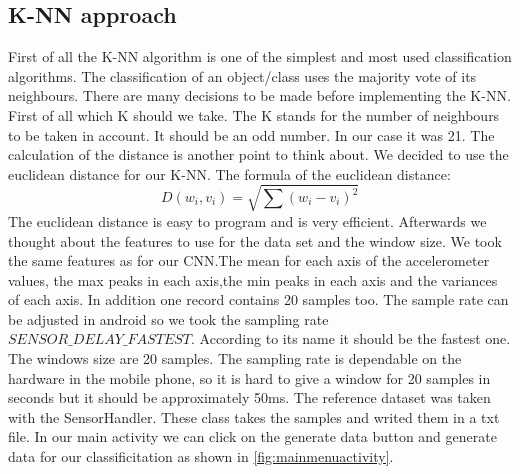 \documentclass[conference]{IEEEtran}
\begin{document}
\subsection{K-NN approach}
First of all the K-NN algorithm is one of the simplest and most used classification algorithms. The classification of an object/class uses the majority vote of its neighbours. There are many decisions to be made before implementing the K-NN. First of all which K should we take. The K stands for the number of neighbours to be taken in account. It should be an odd number. In our case it was 21. The calculation of the distance is another point to think about. We decided to use the euclidean distance for our K-NN. The formula of the euclidean distance:
\begin{equation}
D(w_i,v_i) = \sqrt{\sum{(w_i - v_i)^2}}
\end{equation}
The euclidean distance is easy to program and is very efficient. Afterwards we thought about the features to use for the data set and the window size. We took the same features as for our CNN.The mean for each axis of the accelerometer values, the max peaks in each axis,the min peaks in each axis and the variances of each axis.  In addition one record contains 20 samples too. The sample rate can be adjusted in android so we took the sampling rate $SENSOR\_DELAY\_FASTEST$. According to its name it should be the fastest one. The windows size are 20 samples. The sampling rate is dependable on the hardware in the mobile phone, so it is hard to give a window for 20 samples in seconds but it should be approximately 50ms. The reference dataset was  taken with the SensorHandler. These class takes the samples and writed them in a txt file. In our main activity we can click on the generate data button and generate data for our classificitation as shown in 
\ref{fig:mainmenuactivity}.
\\ 
\end{document}
